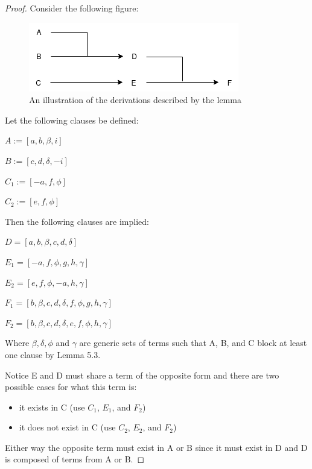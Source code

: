\documentclass[manuscript]{acmart}
\begin{document}
    \begin{proof}
        Consider the following figure:

        \begin{figure}[h]
            \includegraphics[scale=0.8]{518a}
            \caption{An illustration of the derivations described by the lemma}
        \end{figure}

        Let the following clauses be defined:

        $A := [a, b, \beta, i]$

        $B := [c, d, \delta, -i]$

        $C_1 := [-a, f, \phi]$
        
        $C_2 := [e, f, \phi]$
        
        Then the following clauses are implied:
        
        $D = [a, b, \beta, c, d, \delta]$
        
        $E_1 = [-a, f, \phi, g, h, \gamma]$
        
        $E_2 = [e, f, \phi, -a, h, \gamma]$
        
        $F_1 = [b, \beta, c, d, \delta, f, \phi, g, h, \gamma]$
        
        $F_2 = [b, \beta, c, d, \delta, e, f, \phi, h, \gamma]$
        
        Where $\beta, \delta, \phi$ and $\gamma$ are generic sets of terms
        such that A, B, and C block at least one clause by Lemma 5.3.
        
        Notice E and D must share a term of the opposite form and there are two possible cases for what this term is: 
            \begin{itemize}
                \item it exists in C (use $C_1$, $E_1$, and $F_2$)
                \item it does not exist in C (use $C_2$, $E_2$, and $F_2$)
            \end{itemize}
        Either way the opposite term must exist in A or B since it must exist in D and D is composed of terms from A or B.
        

\end{proof}
\end{document}
